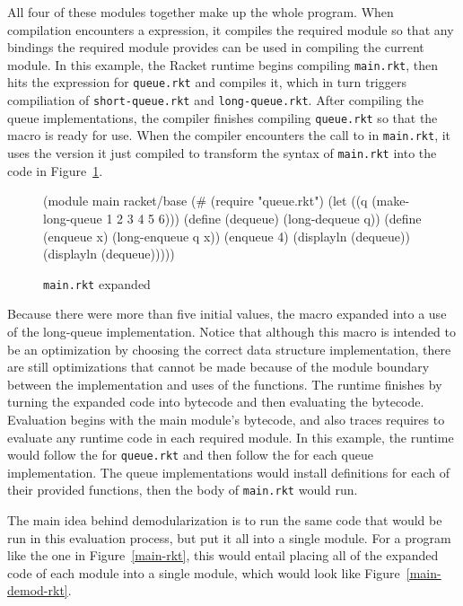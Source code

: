 \documentclass[preprint]{sigplanconf}
\begin{document}
All four of these modules together make up the whole program.
When compilation encounters a  expression, it compiles the required module so that any bindings the required module provides can be used in compiling the current module.
In this example, the Racket runtime begins compiling \texttt{main.rkt}, then hits the  expression for \texttt{queue.rkt} and compiles it, which in turn triggers compiliation of \texttt{short-queue.rkt} and \texttt{long-queue.rkt}. 
After compiling the queue implementations, the compiler finishes compiling \texttt{queue.rkt} so that the  macro is ready for use.
When the compiler encounters the call to  in \texttt{main.rkt}, it uses the version it just compiled to transform the syntax of \texttt{main.rkt} into the code in Figure~\ref{main-rkt-expanded}.

\begin{figure}[h]
\begin{schemedisplay}
(module main racket/base
  (#%
   (require "queue.rkt")
   (let ((q (make-long-queue 1 2 3 4 5 6)))
     (define (dequeue) (long-dequeue q))
     (define (enqueue x) (long-enqueue q x))
     (enqueue 4)
     (displayln (dequeue))
     (displayln (dequeue)))))
\end{schemedisplay}
\caption{\texttt{main.rkt} expanded}
\label{main-rkt-expanded}
\end{figure}

Because there were more than five initial values, the macro expanded into a use of the long-queue implementation.
Notice that although this macro is intended to be an optimization by choosing the correct data structure implementation, there are still optimizations that cannot be made because of the module boundary between the implementation and uses of the  functions.
The runtime finishes by turning the expanded code into bytecode and then evaluating the bytecode.
Evaluation begins with the main module's bytecode, and also traces requires to evaluate any runtime code in each required module.
In this example, the runtime would follow the  for \texttt{queue.rkt} and then follow the  for each queue implementation. 
The queue implementations would install definitions for each of their provided functions, then the body of \texttt{main.rkt} would run.

The main idea behind demodularization is to run the same code that would be run in this evaluation process, but put it all into a single module.
For a program like the one in Figure~\ref{main-rkt}, this would entail placing all of the expanded code of each module into a single module, which would look like Figure~\ref{main-demod-rkt}.
\end{document}
